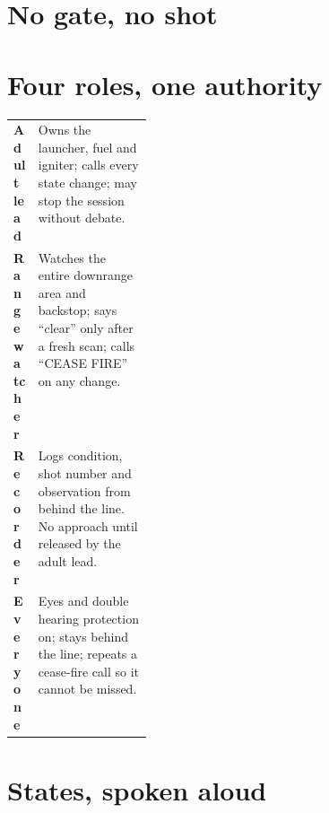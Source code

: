 


\telosmasthead[\editiontag]
\adultonly

\section{No gate, no shot}
\begin{telosframe}
\fixedgates
\end{telosframe}

\section{Four roles, one authority}
\begin{tabularx}{\linewidth}{@{}p{0.18\linewidth}L@{}}
\toprule
\textbf{Adult lead} & Owns the launcher, fuel and igniter; calls every state
change; may stop the session without debate.\\
\textbf{Range watcher} & Watches the entire downrange area and backstop; says
``clear'' only after a fresh scan; calls ``CEASE FIRE'' on any change.\\
\textbf{Recorder} & Logs condition, shot number and observation from behind the
line. No approach until released by the adult lead.\\
\textbf{Everyone} & Eyes and double hearing protection on; stays behind the
line; repeats a cease-fire call so it cannot be missed.\\
\bottomrule
\end{tabularx}

\section{States, spoken aloud}
\begin{center}
\end{center}

